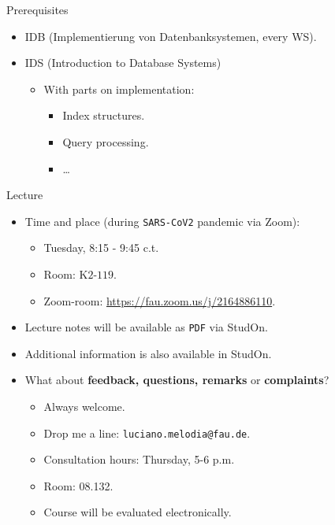 \documentclass[aspectratio=169,t]{beamer}
\begin{document}
  { %
    \begin{frame}{Prerequisites}
      \begin{itemize}
          \item IDB (Implementierung von Datenbanksystemen, every WS).
          \item IDS (Introduction to Database Systems)
              \begin{itemize}
                  \item With parts on implementation:
                    \begin{itemize}
                        \item Index structures.
                        \item Query processing.
                        \item \ldots
                    \end{itemize}
              \end{itemize}
      \end{itemize}
    \end{frame}
  }

  { %
    \begin{frame}{Lecture}
      \begin{itemize}
          \item Time and place (during \texttt{SARS-CoV2} pandemic via Zoom):
              \begin{itemize}
                  \item Tuesday, 8:15 - 9:45 c.t.
                  \item Room: K$2$-$119$.
                  \item Zoom-room: \href{https://fau.zoom.us/j/2164886110}{https://fau.zoom.us/j/2164886110}.
              \end{itemize}
          \item Lecture notes will be available as \texttt{PDF} via StudOn.
          \item Additional information is also available in StudOn.
          \item What about \textbf{feedback, questions, remarks} or \textbf{complaints}?
              \begin{itemize}
                  \item Always welcome.
                  \item Drop me a line: \texttt{luciano.melodia@fau.de}.
                  \item Consultation hours: Thursday, 5-6 p.m.
                  \item Room: 08.132.
                  \item Course will be evaluated electronically.
              \end{itemize}
      \end{itemize}
    \end{frame}
  }
\end{document}
